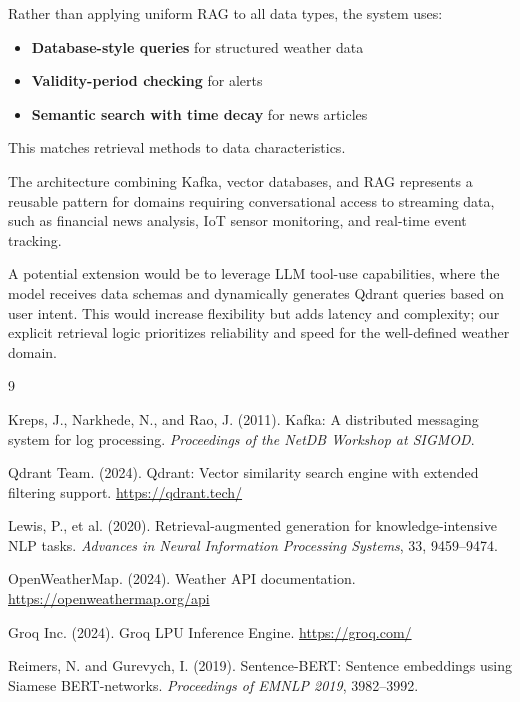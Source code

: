 \documentclass[11pt,a4paper]{article}
\begin{document}
\begin{highlightbox}
Rather than applying uniform RAG to all data types, the system uses:
\begin{itemize}[leftmargin=1.5em, itemsep=0.1em, topsep=0.2em]
    \item \textbf{Database-style queries} for structured weather data
    \item \textbf{Validity-period checking} for alerts
    \item \textbf{Semantic search with time decay} for news articles
\end{itemize}
This matches retrieval methods to data characteristics.
\end{highlightbox}

\vspace{0.5em}

The architecture combining Kafka, vector databases, and RAG represents a reusable pattern for domains requiring conversational access to streaming data, such as financial news analysis, IoT sensor monitoring, and real-time event tracking.

A potential extension would be to leverage LLM tool-use capabilities, where the model receives data schemas and dynamically generates Qdrant queries based on user intent. This would increase flexibility but adds latency and complexity; our explicit retrieval logic prioritizes reliability and speed for the well-defined weather domain.

\newpage

\begin{thebibliography}{9}

Kreps, J., Narkhede, N., and Rao, J. (2011). Kafka: A distributed messaging system for log processing. \textit{Proceedings of the NetDB Workshop at SIGMOD}.

Qdrant Team. (2024). Qdrant: Vector similarity search engine with extended filtering support. \url{https://qdrant.tech/}

Lewis, P., et al. (2020). Retrieval-augmented generation for knowledge-intensive NLP tasks. \textit{Advances in Neural Information Processing Systems}, 33, 9459--9474.

OpenWeatherMap. (2024). Weather API documentation. \url{https://openweathermap.org/api}

Groq Inc. (2024). Groq LPU Inference Engine. \url{https://groq.com/}

Reimers, N. and Gurevych, I. (2019). Sentence-BERT: Sentence embeddings using Siamese BERT-networks. \textit{Proceedings of EMNLP 2019}, 3982--3992.

\end{thebibliography}
\end{document}

